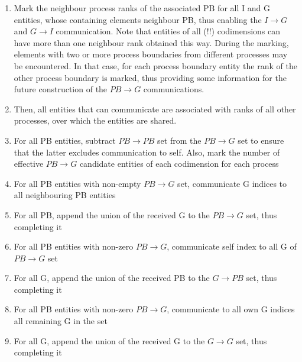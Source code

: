 \begin{mybox}
\begin{enumerate}
	\item Mark the neighbour process ranks of the associated PB for all I and G entities, whose containing elements neighbour PB, thus enabling the $I \rightarrow G$ and $G \rightarrow I$ communication. Note that entities of all (!!) codimensions can have more than one neighbour rank obtained this way. During the marking, elements with two or more process boundaries from different processes may be encountered. In that case, for each process boundary entity the rank of the other process boundary is marked, thus providing some information for the future construction of the $PB \rightarrow G$ communications.
	\item Then, all entities that can communicate are associated with ranks of all other processes, over which the entities are shared.%
	\item For all PB entities, subtract $PB\rightarrow PB$ set from the $PB \rightarrow G$ set to ensure that the latter excludes communication to self. Also, mark the number of effective $PB \rightarrow G$ candidate entities of each codimension for each process
	\item For all PB entities with non-empty $PB \rightarrow G$ set, communicate G indices to all neighbouring PB entities
	\item For all PB, append the union of the received G to the $PB \rightarrow G$ set, thus completing it %
	\item For all PB entities with non-zero $PB \rightarrow G$, communicate self index to all G of $PB \rightarrow G$ set
	\item For all G, append the union of the received PB to the $G \rightarrow PB$ set, thus completing it %
	\item For all PB entities with non-zero $PB \rightarrow G$, communicate to all own G indices all remaining G in the set
	\item For all G, append the union of the received G to the $G \rightarrow G$ set, thus completing it %
\end{enumerate}
\end{mybox}



